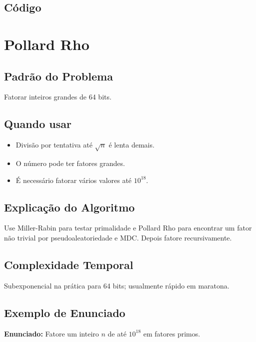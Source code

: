 \subsection{Código}

\section{Pollard Rho}

\subsection{Padrão do Problema}
Fatorar inteiros grandes de 64 bits.

\subsection{Quando usar}
\begin{itemize}[nosep]
  \item Divisão por tentativa até $\sqrt n$ é lenta demais.
  \item O número pode ter fatores grandes.
  \item É necessário fatorar vários valores até $10^{18}$.
\end{itemize}

\subsection{Explicação do Algoritmo}
Use Miller-Rabin para testar primalidade e Pollard Rho para encontrar um fator não trivial por pseudoaleatoriedade e MDC. Depois fatore recursivamente.

\subsection{Complexidade Temporal}
Subexponencial na prática para 64 bits; usualmente rápido em maratona.

\subsection{Exemplo de Enunciado}
\begin{exemplodiabox}
\textbf{Enunciado:} Fatore um inteiro $n$ de até $10^{18}$ em fatores primos.
\end{exemplodiabox}


